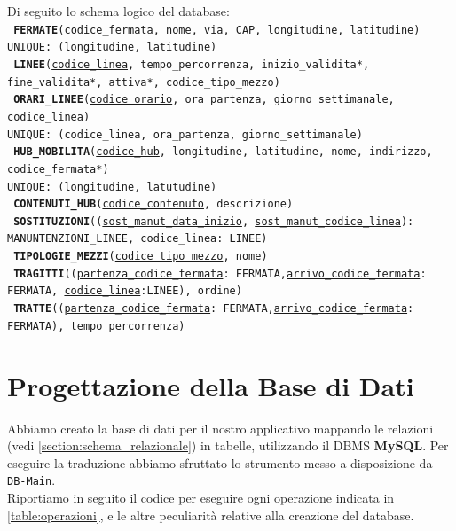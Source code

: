 \documentclass[12pt,a4paper]{report}
\begin{document}
Di seguito lo schema logico del database:\\
\texttt{
\textbf{FERMATE}(\underline{codice\_fermata}, nome, via, CAP, longitudine, latitudine)\\
UNIQUE: (longitudine, latitudine)
}
\\
\texttt {
\textbf{LINEE}(\underline{codice\_linea}, tempo\_percorrenza, inizio\_validita*, fine\_validita*, attiva*, codice\_tipo\_mezzo)
}
\\
\texttt{
    \textbf{ORARI\_LINEE}(\underline{codice\_orario}, ora\_partenza, giorno\_settimanale, codice\_linea)\\
    UNIQUE: (codice\_linea, ora\_partenza, giorno\_settimanale)
}
\\
\texttt{
    \textbf{HUB\_MOBILITA}(\underline{codice\_hub}, longitudine, latitudine, nome, indirizzo, codice\_fermata*)\\
    UNIQUE: (longitudine, latutudine)
}
\\
\texttt{
    \textbf{CONTENUTI\_HUB}(\underline{codice\_contenuto}, descrizione) 
}
\\
\texttt{
    \textbf{SOSTITUZIONI}((\underline{sost\_manut\_data\_inizio}, \underline{sost\_manut\_codice\_linea}): MANUNTENZIONI\_LINEE, codice\_linea: LINEE)
}
\\
\texttt{
    \textbf{TIPOLOGIE\_MEZZI}(\underline{codice\_tipo\_mezzo}, nome)
}
\\
\texttt{
    \textbf{TRAGITTI}((\underline{partenza\_codice\_fermata}: FERMATA,\underline{arrivo\_codice\_fermata}: FERMATA, \underline{codice\_linea}:LINEE), ordine)
}
\\
\texttt{
    \textbf{TRATTE}((\underline{partenza\_codice\_fermata}: FERMATA,\underline{arrivo\_codice\_fermata}: FERMATA), tempo\_percorrenza)
}

\chapter{Progettazione della Base di Dati}

Abbiamo creato la base di dati per il nostro applicativo mappando le relazioni (vedi \autoref{section:schema_relazionale}) in tabelle, utilizzando il DBMS \textbf{MySQL}. Per eseguire la traduzione abbiamo sfruttato lo strumento messo a disposizione da \texttt{DB-Main}. \\
Riportiamo in seguito il codice per eseguire ogni operazione indicata in \autoref{table:operazioni}, e le altre peculiarità relative alla creazione del database.
\end{document}
